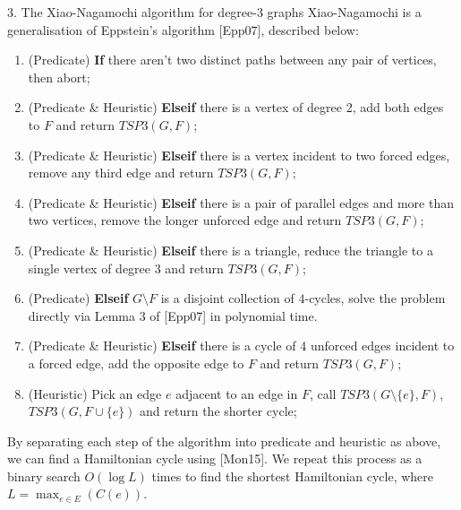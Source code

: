 \documentclass[]{templates/poster}
\begin{document}
\begin{frame}{}
\begin{columns}[t]
  \begin{column}{0.422\linewidth}
  \begin{block}{\Large 3. The Xiao-Nagamochi algorithm for degree-3 graphs}
  Xiao-Nagamochi is a generalisation of Eppstein's algorithm [Epp07], described below:
  \begin{enumerate}
\item (Predicate) {\bf If} there aren't two distinct paths between any pair of vertices, then abort;
\item (Predicate \& Heuristic) {\bf Elseif} there is a vertex of degree 2, add both edges to $F$ and return $TSP3(G, F)$;
\item (Predicate \& Heuristic) {\bf Elseif} there is a vertex incident to two forced edges, remove any third edge and return $TSP3(G, F)$;
\item (Predicate \& Heuristic) {\bf Elseif} there is a pair of parallel edges and more than two vertices, remove the longer unforced edge and return $TSP3(G, F)$;
\item (Predicate \& Heuristic) {\bf Elseif} there is a triangle, reduce the triangle to a single vertex of degree 3 and return $TSP3(G, F)$;
\item (Predicate) {\bf Elseif} $G \setminus F$ is a disjoint collection of $4$-cycles, solve the problem directly via Lemma 3 of [Epp07] in polynomial time.
\item (Predicate \& Heuristic) {\bf Elseif} there is a cycle of 4 unforced edges incident to a forced edge, add the opposite edge to $F$ and return $TSP3(G, F)$;
\item (Heuristic) Pick an edge $e$ adjacent to an edge in $F$, call $TSP3(G\setminus \{e\}, F)$, $TSP3(G, F \cup \{e\})$ and return the shorter cycle;
\end{enumerate}

  By separating each step of the algorithm into predicate and heuristic as above, we can find a Hamiltonian cycle using [Mon15]. We repeat this process as a binary search $O(\log L)$ times to find the shortest Hamiltonian cycle, where $L = \max_{e \in E}(C(e))$.
  \end{block}
  \end{column}
\end{columns}
  
  \begin{columns}[t]
  \begin{column}{0.422\linewidth}


\end{column}
\end{columns}
\end{frame}
\end{document}
